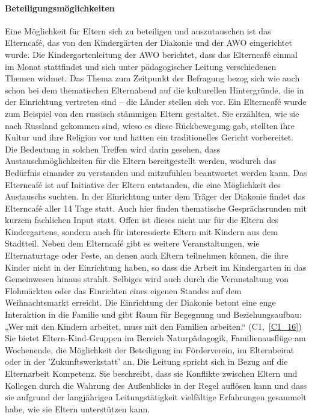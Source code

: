 \paragraph{Beteiligungsmöglichkeiten}
Eine Möglichkeit für Eltern sich zu beteiligen und auszutauschen ist das Elterncafé, das von den Kindergärten der Diakonie und der AWO eingerichtet wurde. 
Die Kindergartenleitung der AWO berichtet, dass das Elterncafé einmal im Monat stattfindet und sich unter pädagogischer Leitung verschiedenen Themen widmet. Das Thema zum Zeitpunkt der Befragung bezog sich wie auch schon bei dem thematischen Elternabend auf die kulturellen Hintergründe, die in der Einrichtung vertreten sind – die Länder stellen sich vor. Ein Elterncafé wurde zum Beispiel von den russisch stämmigen Eltern gestaltet. Sie erzählten, wie sie 
nach Russland gekommen sind, wieso es diese Rückbewegung gab, stellten ihre Kultur und ihre Religion vor und hatten ein traditionelles Gericht vorbereitet. 
Die Bedeutung in solchen Treffen wird darin gesehen, dass Austauschmöglichkeiten für die Eltern bereitgestellt werden, wodurch das Bedürfnis einander zu verstanden und mitzufühlen beantwortet werden kann. Das Elterncafé ist auf Initiative der Eltern entstanden, die eine Möglichkeit des Austauschs suchten. 
In der Einrichtung unter dem Träger der Diakonie findet das Elterncafé aller 14 Tage statt. Auch hier finden thematische Gesprächsrunden mit kurzem fachlichen Input statt. Offen ist dieses nicht nur für die Eltern des Kindergartens, sondern auch für interessierte Eltern mit Kindern aus dem Stadtteil. 
Neben dem Elterncafé gibt es weitere Veranstaltungen, wie Elternaturtage oder Feste, an denen auch Eltern teilnehmen können, die ihre Kinder nicht in der Einrichtung haben, so dass die Arbeit im Kindergarten in das Gemeinwesen hinaus strahlt. Selbiges wird auch durch die Veranstaltung von Flohmärkten oder das Einrichten eines eigenen Standes auf dem Weihnachtsmarkt erreicht.
Die Einrichtung der Diakonie betont eine enge Interaktion in die Familie und gibt Raum für Begegnung und Beziehungsaufbau: „Wer mit den Kindern arbeitet, muss mit den Familien arbeiten.“ (C1,~\ref{C1_16}) Sie bietet Eltern-Kind-Gruppen im Bereich Naturpädagogik, Familienausflüge am Wochenende, die Möglichkeit der Beteiligung im Förderverein, im Elternbeirat oder in der 'Zukunftswerkstatt' an. Die Leitung spricht sich in Bezug auf die Elternarbeit Kompetenz. Sie beschreibt, dass sie Konflikte zwischen Eltern und Kollegen durch die Wahrung des Außenblicks in der Regel auflösen kann und dass sie aufgrund der langjährigen Leitungstätigkeit vielfältige Erfahrungen gesammelt habe, wie sie Eltern unterstützen kann.  
